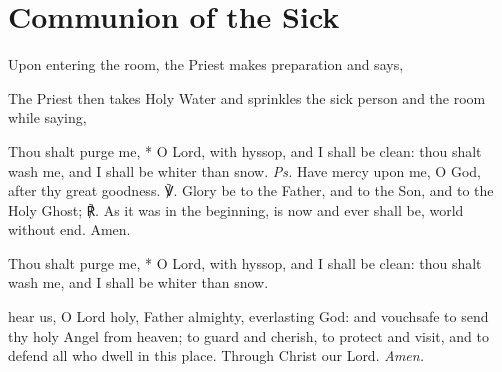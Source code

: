 \fancyhead[RE,LO]{\textit{}}
\section{Communion of the Sick}
\begin{secrubric}
    Upon entering the room, the Priest makes preparation and says,
\end{secrubric}
\begin{rubric}
    The Priest then takes Holy Water and sprinkles the sick person and the room while saying,
\end{rubric}
Thou shalt purge me, * O Lord, with hyssop, and I shall be clean: thou shalt wash me, and I shall be whiter than snow. \textit{Ps.} Have mercy upon me, O God, after thy great goodness. ℣. Glory be to the Father, and to the Son, and to the Holy Ghost; ℟. As it was in the beginning, is now and ever shall be, world without end. Amen.\par
Thou shalt purge me, * O Lord, with hyssop, and I shall be clean: thou shalt wash me, and I shall be whiter than snow.

{} hear us, O Lord holy, Father almighty, everlasting God: and vouchsafe to send thy holy Angel from heaven; to guard and cherish, to protect and visit, and to defend all who dwell in this place. Through Christ our Lord. \textit{Amen.}

